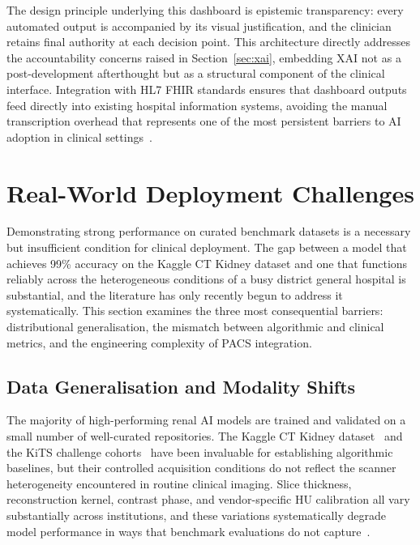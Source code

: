 The design principle underlying this dashboard is epistemic transparency: every automated output is accompanied by its visual justification, and the clinician retains final authority at each decision point. This architecture directly addresses the accountability concerns raised in Section~\ref{sec:xai}, embedding XAI not as a post-development afterthought but as a structural component of the clinical interface. Integration with HL7 FHIR standards ensures that dashboard outputs feed directly into existing hospital information systems, avoiding the manual transcription overhead that represents one of the most persistent barriers to AI adoption in clinical settings~\cite{liang2025multicenter}.


\section{Real-World Deployment Challenges}
\label{sec:challenges}

Demonstrating strong performance on curated benchmark datasets is a necessary but insufficient condition for clinical deployment. The gap between a model that achieves 99\% accuracy on the Kaggle CT Kidney dataset and one that functions reliably across the heterogeneous conditions of a busy district general hospital is substantial, and the literature has only recently begun to address it systematically. This section examines the three most consequential barriers: distributional generalisation, the mismatch between algorithmic and clinical metrics, and the engineering complexity of PACS integration.

\subsection{Data Generalisation and Modality Shifts}
\label{subsec:generalization_shifts}

The majority of high-performing renal AI models are trained and validated on a small number of well-curated repositories. The Kaggle CT Kidney dataset~\cite{ahmed2021ct, hossain2025detection} and the KiTS challenge cohorts~\cite{heller2023kits21} have been invaluable for establishing algorithmic baselines, but their controlled acquisition conditions do not reflect the scanner heterogeneity encountered in routine clinical imaging. Slice thickness, reconstruction kernel, contrast phase, and vendor-specific HU calibration all vary substantially across institutions, and these variations systematically degrade model performance in ways that benchmark evaluations do not capture~\cite{abdelrahman2022deep}. 

